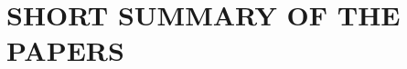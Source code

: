 \documentclass[a4paper, 12pt, titlepage,oneside,drop]{kthesis}
\begin{document}

\chapter{SHORT SUMMARY OF THE PAPERS}
\end{document}

